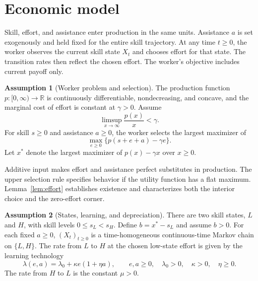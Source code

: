\documentclass[11pt]{article}
\theoremstyle{definition}
\newtheorem{assumption}{Assumption}
\begin{document}
\section{Economic model}\label{sec:model}
Skill, effort, and assistance enter production in the same units.
Assistance $a$ is set exogenously and held fixed for the entire skill
trajectory. At any time $t\geq0$, the worker observes the current skill
state $X_t$ and chooses effort for that state. The transition rates then
reflect the chosen effort. The worker's objective includes current payoff
only.

\begin{assumption}[Worker problem and selection]\label{ass:worker}
The production function $p:[0,\infty)\to\mathbb R$ is continuously
differentiable, nondecreasing, and concave, and the marginal cost of effort
is constant at $\gamma>0$. Assume
\begin{equation}\label{eq:growth}
 \limsup_{x\to\infty}\frac{p(x)}{x}<\gamma.
\end{equation}
For skill $s\geq0$ and assistance $a\geq0$, the worker selects the largest
maximizer of
\begin{equation}\label{eq:worker}
 \max_{e\geq0}\{p(s+e+a)-\gamma e\}.
\end{equation}
Let $x^*$ denote the largest maximizer of $p(x)-\gamma x$ over $x\geq0$.
\end{assumption}

Additive input makes effort and assistance perfect substitutes in
production. The upper selection rule specifies behavior if the utility
function has a flat maximum. Lemma~\ref{lem:effort} establishes existence
and characterizes both the interior choice and the zero-effort corner.

\begin{assumption}[States, learning, and depreciation]\label{ass:chain}
There are two skill states, $L$ and $H$, with skill levels
$0\leq s_L<s_H$. Define $b=x^*-s_L$ and assume $b>0$. For each fixed
$a\geq0$, $(X_t)_{t\geq0}$ is a time-homogeneous continuous-time Markov
chain on $\{L,H\}$. The rate from $L$ to $H$ at the chosen low-state effort
is given by the learning technology
\begin{equation}\label{eq:technology}
 \lambda(e,a)=\lambda_0+\kappa e(1+\eta a),\qquad
 e,a\geq0,\quad \lambda_0>0,\quad \kappa>0,\quad \eta\geq0.
\end{equation}
The rate from $H$ to $L$ is the constant $\mu>0$.
\end{assumption}
\end{document}
